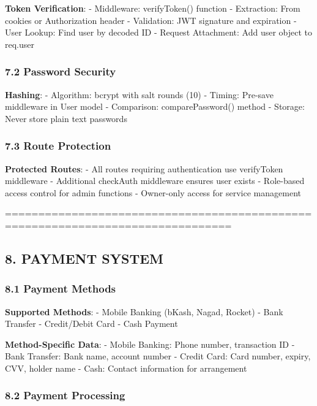 \documentclass[12pt,a4paper]{article}
\begin{document}
\textbf{Token Verification}: - Middleware: verifyToken() function -
Extraction: From cookies or Authorization header - Validation: JWT
signature and expiration - User Lookup: Find user by decoded ID -
Request Attachment: Add user object to req.user

\hypertarget{password-security}{%
\subsubsection{7.2 Password Security}\label{password-security}}

\textbf{Hashing}: - Algorithm: bcrypt with salt rounds (10) - Timing:
Pre-save middleware in User model - Comparison: comparePassword() method
- Storage: Never store plain text passwords

\hypertarget{route-protection}{%
\subsubsection{7.3 Route Protection}\label{route-protection}}

\textbf{Protected Routes}: - All routes requiring authentication use
verifyToken middleware - Additional checkAuth middleware ensures user
exists - Role-based access control for admin functions - Owner-only
access for service management

================================================================================

\hypertarget{payment-system}{%
\subsection{8. PAYMENT SYSTEM}\label{payment-system}}

\hypertarget{payment-methods}{%
\subsubsection{8.1 Payment Methods}\label{payment-methods}}

\textbf{Supported Methods}: - Mobile Banking (bKash, Nagad, Rocket) -
Bank Transfer - Credit/Debit Card - Cash Payment

\textbf{Method-Specific Data}: - Mobile Banking: Phone number,
transaction ID - Bank Transfer: Bank name, account number - Credit Card:
Card number, expiry, CVV, holder name - Cash: Contact information for
arrangement

\hypertarget{payment-processing}{%
\subsubsection{8.2 Payment Processing}\label{payment-processing}}
\end{document}
